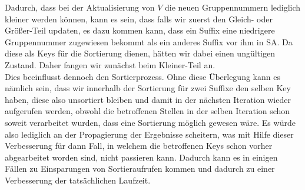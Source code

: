 Dadurch, dass bei der Aktualisierung von $V$ die neuen Gruppennummern lediglich kleiner werden können, kann es sein, dass falls wir zuerst den \glqq Gleich\grqq{}- oder \glqq Größer\grqq{}-Teil updaten, es dazu kommen kann, dass ein Suffix eine niedrigere Gruppennummer zugewiesen bekommt als ein anderes Suffix vor ihm in SA. Da diese als Keys für die Sortierung dienen, hätten wir dabei einen ungültigen Zustand. Daher fangen wir zunächst beim \glqq Kleiner\grqq{}-Teil an. \\
Dies beeinflusst dennoch den Sortierprozess. Ohne diese Überlegung kann es nämlich sein, dass wir innerhalb der Sortierung für zwei Suffixe den selben Key haben, diese also unsortiert bleiben und damit in der nächsten Iteration wieder aufgerufen werden, obwohl die betroffenen Stellen in der selben Iteration schon soweit verarbeitet wurden, dass eine Sortierung möglich gewesen wäre. Es würde also lediglich an der Propagierung der Ergebnisse scheitern, was mit Hilfe dieser Verbesserung für dann Fall, in welchem die betroffenen Keys schon vorher abgearbeitet worden sind, nicht passieren kann. Dadurch kann es in einigen Fällen zu Einsparungen von Sortieraufrufen kommen und dadurch zu einer Verbesserung der tatsächlichen Laufzeit.
